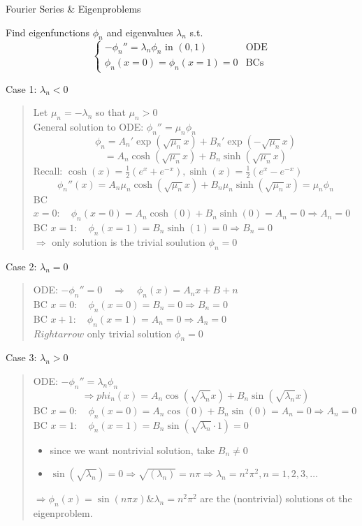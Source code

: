 Fourier Series \& Eigenproblems
\begin{example}
    Find eigenfunctions $\phi_n$ and eigenvalues $\lambda_n$ s.t.
    \[\begin{cases*}
        - \phi_n'' = \lambda_n \phi_n \text{ in } (0,1) &\text{ODE} \\
        \phi_n(x=0) = \phi_n(x=1) = 0 &\text{BCs}
    \end{cases*}\]

    Case 1: $\lambda_n <0 $
    \begin{quote}
    {   Let $\mu_n = -\lambda_n$ so that $\mu_n > 0$
        \\General solution to ODE: $\phi_n'' = \mu_n \phi_n$
        \[\phi_n = A_n' \exp(\sqrt{\mu_n}x)+B_n' \exp(-\sqrt{\mu_n}x)\]
        \[=A_n \cosh(\sqrt{\mu_n}x)+B_n \sinh(\sqrt{\mu_n}x)\]
        Recall: $\cosh(x) = \frac{1}{2}(e^x+e^{-x}), \sinh(x) = \frac{1}{2}(e^x - e^{-x})$
        \[\phi_n''(x) = A_n \mu_n \cosh(\sqrt{\mu_n}x) + B_n \mu_n \sinh(\sqrt{\mu_n} x) = \mu_n \phi_n\] 
        BC \@ $x=0: \quad \phi_n(x=0) = A_n \cosh(0) + B_n\sinh(0) = A_n = 0 \Rightarrow A_n = 0$ \\
        BC \@ $x=1: \quad \phi_n(x=1) = B_n \sinh(1) = 0 \Rightarrow B_n = 0$
        \\$\Rightarrow$ only solution is the trivial soulution $\phi_n = 0$} 
    \end{quote}

    Case 2: $\lambda_n = 0$
    \begin{quote}
        ODE: $-\phi_n '' = 0 \quad \Rightarrow \quad \phi_n(x) = A_n x+B+n$
        \\BC \@ $x=0: \quad \phi_n(x=0) = B_n = 0 \Rightarrow B_n = 0$
        \\BC \@ $x+1: \quad \phi_n(x=1) = A_n = 0 \Rightarrow A_n = 0$
        \\$Rightarrow$ only trivial solution $\phi_n = 0$
    \end{quote}


    Case 3: $\lambda_n > 0$
    \begin{quote}
        ODE: $-\phi_n'' = \lambda_n\phi_n$
        \[\Rightarrow phi_n(x) = A_n \cos (\sqrt{\lambda_n}x)+ B_n\sin(\sqrt{\lambda_n}x)\]
        BC \@ $x=0: \quad \phi_n(x=0) = A_n \cos(0)+ B_n\sin(0) = A_n = 0 \Rightarrow A_n=0$ \\
        BC \@ $x=1: \quad \phi_n(x=1) = B_n\sin(\sqrt{\lambda_n} \cdot 1) = 0$
        \begin{itemize}[label = $\Rightarrow$]
            \item since we want nontrivial solution, take $B_n \neq 0$
            \item $\sin(\sqrt{\lambda_n}) = 0 \Rightarrow \sqrt{(\lambda_n)} = n\pi \Rightarrow \lambda_n = n^2\pi^2, n = 1,2,3,\dots$
        \end{itemize}
        $\Rightarrow \phi_n(x) = \sin(n\pi x) \& \lambda_n = n^2\pi^2$ are the (nontrivial) solutions ot the eigenproblem.
    \end{quote}
\end{example}

